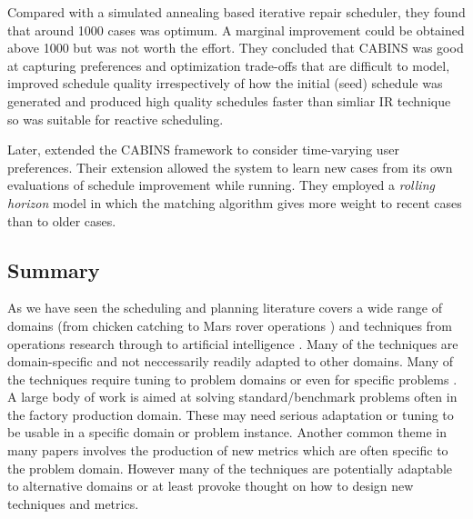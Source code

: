 Compared with a simulated annealing based iterative repair scheduler, they found that around 1000 cases was optimum. A marginal improvement could be obtained above 1000 but was not worth the effort. They concluded that CABINS was good at capturing preferences and optimization trade-offs that are difficult to model, improved schedule quality irrespectively of how the initial (seed) schedule was generated and produced high quality schedules faster than simliar IR technique so was suitable for reactive scheduling.



Later, \citet{sycara96case} extended the CABINS framework to consider time-varying user preferences. Their extension allowed the system to learn new cases from its own evaluations of schedule improvement while running. They employed a \emph{rolling horizon} model in which the matching algorithm gives more weight to recent cases than to older cases.



%
%


%
%


\subsection{Summary}
As we have seen the scheduling and planning literature covers a wide range of domains (from chicken catching \citep{hart99chicken} to Mars rover operations \citep{bresina99increased}) and techniques from operations research \citep{bitner75backtrack} through to artificial intelligence \citep{mori94immune}. Many of the techniques are domain-specific \citep{dorn95reactive} and not neccessarily readily adapted to other domains. Many of the techniques require tuning to problem domains or even for specific problems \citep{kirkpatrick83optimization}. A large body of work is aimed at solving standard/benchmark problems often in the factory production domain. These may need serious adaptation or tuning to be usable in a specific domain or problem instance. Another common theme in many papers involves the production of new metrics which are often specific to the problem domain. However many of the techniques are potentially adaptable to alternative domains or at least provoke thought on how to design new techniques and metrics.
